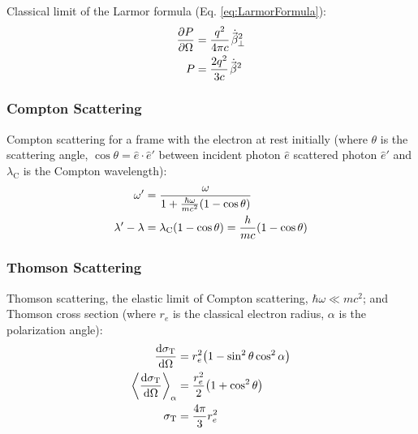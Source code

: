 			\noindent
			Classical limit of the Larmor formula (Eq. \ref{eq:LarmorFormula}):
			\begin{equation}
				\begin{aligned}
					\pdv{P}{\Omega} &= \frac{q^2}{4\pi c}\dot{\vec{\beta}}_\perp^2 \\
					P &= \frac{2 q^2}{3 c}\dot{\vec{\beta}}^2\\
				\end{aligned}
			\end{equation}

		\subsubsection{Compton Scattering}
			Compton scattering for a frame with the electron at rest initially (where $\theta$ is the scattering angle, $\cos\theta = \hat{e}\cdot\hat{e}'$ between incident photon $\hat{e}$ scattered photon $\hat{e}'$ and $\lambda_{\mathrm{C}}$ is the Compton wavelength):
			\begin{equation}
				\begin{aligned}
					\omega' &= \frac{\omega}{1+\frac{\hbar\omega}{mc^2}\qty(1-\cos\theta)} \\
					\lambda' - \lambda &= \lambda_\mathrm{C}(1-\cos\theta) = \frac{h}{m c}(1-\cos\theta)
				\end{aligned}
			\end{equation}

		\subsubsection{Thomson Scattering}
			Thomson scattering, the elastic limit of Compton scattering, \ie $\hbar\omega \ll mc^2$; and Thomson cross section (where $r_e$ is the classical electron radius, $\alpha$ is the polarization angle):
			\begin{equation}
				\begin{aligned}
					\dv{\sigma_\text{T}}{\Omega} &= r_e^2 \qty(1-\sin^2 \theta \cos^2 \alpha) \\
					\left\langle \dv{\sigma_\text{T}}{\Omega} \right\rangle_{\alpha} &= \frac{r_e^2}{2} \qty(1+\cos^2 \theta) \\
					\sigma_\text{T} &= \frac{4\pi}{3}r_e^2 \\
				\end{aligned}
			\end{equation}

